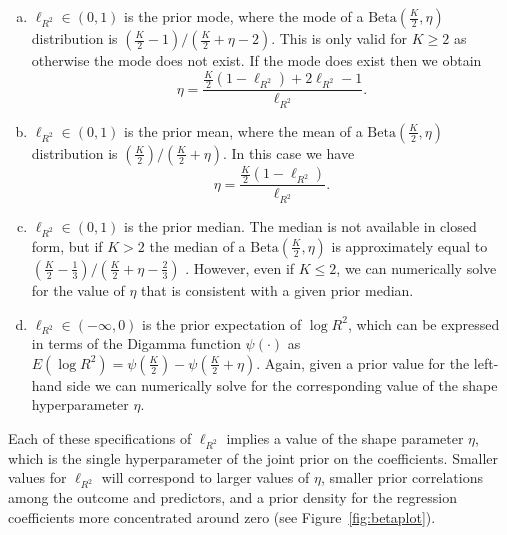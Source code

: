 \documentclass[11pt]{article}
\newcommand{\locRsq}{\ell_{R^2}}
\newcommand{\halfK}{\frac{K}{2}}
\newcommand{\Betadist}[2]{\mathrm{Beta}\left(#1,#2\right)}
\newcommand{\Digamma}[1]{\psi\left(#1\right)}
\begin{document}
\begin{enumerate}[(a)]
\item $\locRsq \in \left(0,1\right)$ is the prior mode, where the mode of a
$\Betadist{\halfK}{\eta}$ distribution is \newline
$\left(\halfK - 1\right) / \left(\halfK + \eta - 2\right)$.
This is only valid for $K \geq 2$ as otherwise the mode does not exist. If
the mode does exist then we obtain
$$\eta = \frac{\halfK \left(1 - \locRsq\right) + 2\locRsq - 1}{\locRsq}.$$

\item $\locRsq \in \left(0,1\right)$ is the prior mean, where the mean of a
$\Betadist{\halfK}{\eta}$ distribution is \newline
$\left(\halfK\right) / \left(\halfK + \eta\right)$. In this case we have
$$\eta = \frac{\halfK \left(1 - \locRsq \right)}{\locRsq}.$$


\item $\locRsq \in \left(0,1\right)$ is the prior median. The median is not
available in closed form, but if $K > 2$ the median of a
$\Betadist{\halfK}{\eta}$ is approximately equal to
$\left(\halfK - \frac{1}{3}\right) / \left(\halfK + \eta - \frac{2}{3}\right)$
\cite{kerman}. However, even if $K \leq 2$, we can numerically solve for the
value of $\eta$ that is consistent with a given prior median.

\item $\locRsq \in \left(-\infty,0\right)$ is the prior expectation of
$\log{R^2}$, which can be expressed in terms of the Digamma function
$\Digamma{\cdot}$ as
$E\left(\log{R^2}\right) = \Digamma{\halfK} - \Digamma{\halfK + \eta}$. Again,
given a prior value for the left-hand side we can numerically solve for the
corresponding value of the shape hyperparameter $\eta$.
\end{enumerate}

Each of these specifications of $\locRsq$ implies a value of the shape parameter
$\eta$, which is the single hyperparameter of the joint prior on the
coefficients. Smaller values for $\locRsq$ will correspond to larger values of
$\eta$, smaller prior correlations among the outcome and predictors, and a prior
density for the regression coefficients more concentrated around zero (see
Figure~\ref{fig:betaplot}).
\end{document}

